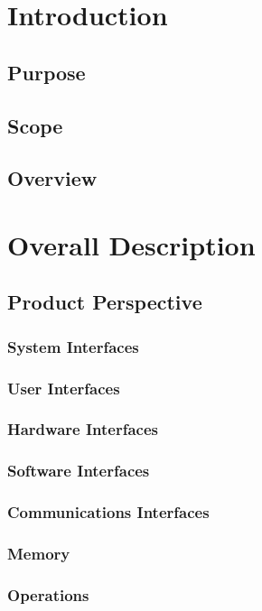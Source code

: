 \documentclass[a4paper,12pt]{article}
\begin{document}
\newpage
\tableofcontents
\newpage

\section{Introduction}
\subsection{Purpose}

\subsection{Scope}

\subsection{Overview}

\section{Overall Description}

\subsection{Product Perspective}
\subsubsection{System Interfaces}
\subsubsection{User Interfaces}
\subsubsection{Hardware Interfaces}
\subsubsection{Software Interfaces}
\subsubsection{Communications Interfaces}
\subsubsection{Memory}
\subsubsection{Operations}
\end{document}
